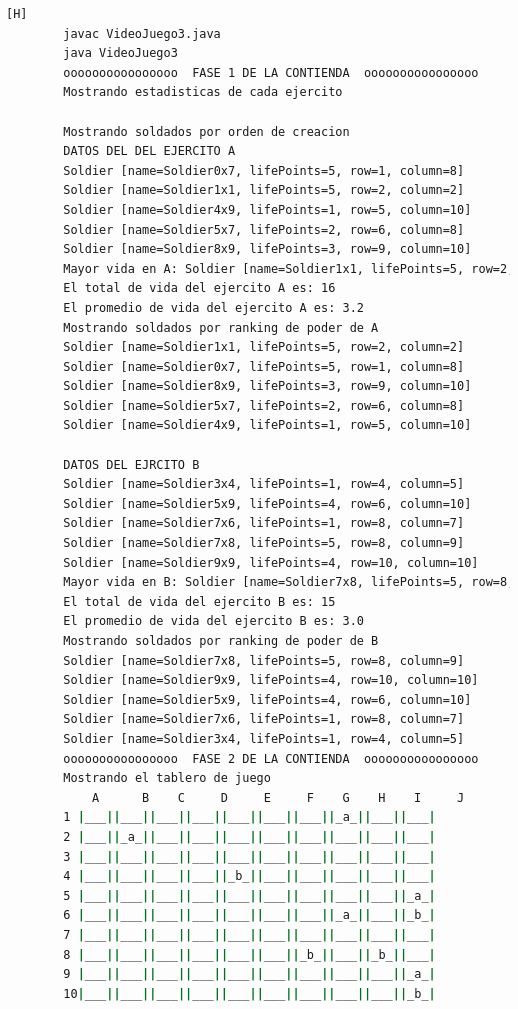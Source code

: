 \documentclass{article}
\begin{document}
	
	\begin{lstlisting}[language=bash,caption={Compilando y probando }][H]
		javac VideoJuego3.java
		java VideoJuego3
		oooooooooooooooo  FASE 1 DE LA CONTIENDA  oooooooooooooooo
		Mostrando estadisticas de cada ejercito
		
		Mostrando soldados por orden de creacion
		DATOS DEL DEL EJERCITO A
		Soldier [name=Soldier0x7, lifePoints=5, row=1, column=8]
		Soldier [name=Soldier1x1, lifePoints=5, row=2, column=2]
		Soldier [name=Soldier4x9, lifePoints=1, row=5, column=10]
		Soldier [name=Soldier5x7, lifePoints=2, row=6, column=8]
		Soldier [name=Soldier8x9, lifePoints=3, row=9, column=10]
		Mayor vida en A: Soldier [name=Soldier1x1, lifePoints=5, row=2, column=2]
		El total de vida del ejercito A es: 16
		El promedio de vida del ejercito A es: 3.2
		Mostrando soldados por ranking de poder de A
		Soldier [name=Soldier1x1, lifePoints=5, row=2, column=2]
		Soldier [name=Soldier0x7, lifePoints=5, row=1, column=8]
		Soldier [name=Soldier8x9, lifePoints=3, row=9, column=10]
		Soldier [name=Soldier5x7, lifePoints=2, row=6, column=8]
		Soldier [name=Soldier4x9, lifePoints=1, row=5, column=10]
		
		DATOS DEL EJRCITO B
		Soldier [name=Soldier3x4, lifePoints=1, row=4, column=5]
		Soldier [name=Soldier5x9, lifePoints=4, row=6, column=10]
		Soldier [name=Soldier7x6, lifePoints=1, row=8, column=7]
		Soldier [name=Soldier7x8, lifePoints=5, row=8, column=9]
		Soldier [name=Soldier9x9, lifePoints=4, row=10, column=10]
		Mayor vida en B: Soldier [name=Soldier7x8, lifePoints=5, row=8, column=9]
		El total de vida del ejercito B es: 15
		El promedio de vida del ejercito B es: 3.0
		Mostrando soldados por ranking de poder de B
		Soldier [name=Soldier7x8, lifePoints=5, row=8, column=9]
		Soldier [name=Soldier9x9, lifePoints=4, row=10, column=10]
		Soldier [name=Soldier5x9, lifePoints=4, row=6, column=10]
		Soldier [name=Soldier7x6, lifePoints=1, row=8, column=7]
		Soldier [name=Soldier3x4, lifePoints=1, row=4, column=5]
		oooooooooooooooo  FASE 2 DE LA CONTIENDA  oooooooooooooooo
		Mostrando el tablero de juego
		    A      B    C     D     E     F    G    H    I     J
		1 |___||___||___||___||___||___||___||_a_||___||___|
		2 |___||_a_||___||___||___||___||___||___||___||___|
		3 |___||___||___||___||___||___||___||___||___||___|
		4 |___||___||___||___||_b_||___||___||___||___||___|
		5 |___||___||___||___||___||___||___||___||___||_a_|
		6 |___||___||___||___||___||___||___||_a_||___||_b_|
		7 |___||___||___||___||___||___||___||___||___||___|
		8 |___||___||___||___||___||___||_b_||___||_b_||___|
		9 |___||___||___||___||___||___||___||___||___||_a_|
		10|___||___||___||___||___||___||___||___||___||_b_|
	\end{lstlisting}
	
\end{document}
